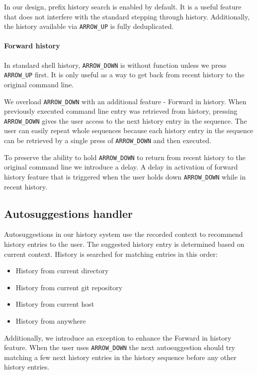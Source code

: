 \documentclass[thesis=M,english]{FITthesis}[2012/10/20]
\begin{document}
In our design, prefix history search is enabled by default. It is a useful feature that does not interfere with the standard stepping through history. Additionally, the history available via \verb|ARROW_UP| is fully deduplicated.

\paragraph{Forward history}

In standard shell history, \verb|ARROW_DOWN| is without function unless we press \verb|ARROW_UP| first. It is only useful as a way to get back from recent history to the original command line.

We overload \verb|ARROW_DOWN| with an additional feature - Forward in history. When previously executed command line entry was retrieved from history, pressing \verb|ARROW_DOWN| gives the user access to the next history entry in the sequence. 
The user can easily repeat whole sequences because each history entry in the sequence can be retrieved by a single press of \verb|ARROW_DOWN| and then executed. 


To preserve the ability to hold \verb|ARROW_DOWN| to return from recent history to the original command line we introduce a delay. A delay in activation of forward history feature that is triggered when the user holds down \verb|ARROW_DOWN| while in recent history.

\subsection{Autosuggestions handler}

Autosuggestions in our history system use the recorded context to recommend history entries to the user. The suggested history entry is determined based on current context. History is searched for matching entries in this order:

\begin{itemize}
    \item History from current directory
    \item History from current git repository
    \item History from current host
    \item History from anywhere
\end{itemize}

Additionally, we introduce an exception to enhance the Forward in history feature. 
When the user uses \verb|ARROW_DOWN| the next autosuggestion should try matching a few next history entries in the history sequence before any  other history entries. 
\end{document}

